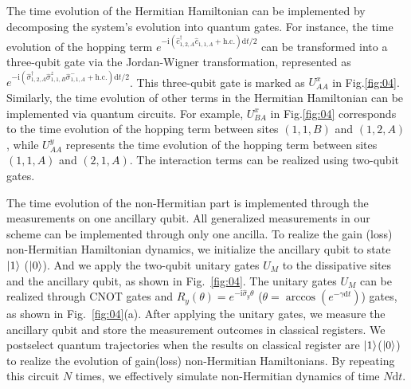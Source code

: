 \documentclass[longbibliography, aps, prx, amsmath, amssymb, amsfonts, twocolumn,superscriptaddress, footinbib]{revtex4-1}
\begin{document}

	The time evolution of the Hermitian Hamiltonian can be implemented by decomposing the system's evolution into quantum gates. For instance, the time evolution of the hopping term $e^{-\mathrm{i} (\hat{c}_{1,2,A}^{\dagger} \hat{c}_{1,1,A} + \text{h.c.})\mathrm{d} t/2}$ can be transformed into a three-qubit gate via the Jordan-Wigner transformation, represented as $e^{-\mathrm{i} (\hat{\sigma}_{1,2,A}^{\dagger} \hat{\sigma}^z_{1,1,B}\hat{\sigma}_{1,1,A}^{-} + \text{h.c.})\mathrm{d} t/2}$. This three-qubit gate is marked as $U_{AA}^x$ in Fig.\ref{fig:04}. Similarly, the time evolution of other terms in the Hermitian Hamiltonian can be implemented via quantum circuits. For example, $U_{BA}^x$ in Fig.\ref{fig:04} corresponds to the time evolution of the hopping term between sites $(1,1,B)$ and $(1,2,A)$, while $U_{AA}^y$ represents the time evolution of the hopping term between sites $(1,1,A)$ and $(2,1,A)$. The interaction terms can be realized using two-qubit gates.

	The time evolution of the non-Hermitian part is implemented through the measurements on one ancillary qubit. 
	All generalized measurements in our scheme can be implemented through only one ancilla. To realize the gain (loss) non-Hermitian Hamiltonian dynamics, we initialize the ancillary qubit to state $\ket{1}$ ($\ket{0}$). And we apply the two-qubit unitary gates $U_M$ to the dissipative sites and the ancillary qubit, as shown in Fig.~\ref{fig:04}. The unitary gates $U_M$ can be realized through CNOT gates and $R_y(\theta) = e^{-\mathrm{i} \hat{\sigma}_y \theta}$ ($\theta = \arccos(e^{-\gamma \mathrm{d}t})$) gates, as shown in Fig.~\ref{fig:04}(a). 
	After applying the unitary gates, we measure the ancillary qubit and store the measurement outcomes in classical registers. 
	We postselect quantum trajectories when the results on classical register are $\ket{1}$($\ket{0}$) to realize the evolution of gain(loss) non-Hermitian Hamiltonians. By repeating this circuit $N$ times, we effectively simulate non-Hermitian dynamics of time $N\mathrm{d}t$.
\end{document}
